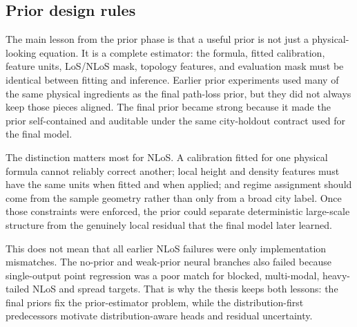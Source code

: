 \subsection{Prior design rules}
\label{sec:good_prior_design}

The main lesson from the prior phase is that a useful prior is not just a
physical-looking equation. It is a complete estimator: the formula, fitted
calibration, feature units, LoS/NLoS mask, topology features, and evaluation
mask must be identical between fitting and inference. Earlier prior experiments
used many of the same physical ingredients as the final path-loss prior, but they did
not always keep those pieces aligned. The final prior became strong because it
made the prior self-contained and auditable under the same city-holdout
contract used for the final model.

The distinction matters most for NLoS. A calibration fitted for one physical
formula cannot reliably correct another; local height and density features
must have the same units when fitted and when applied; and regime assignment
should come from the sample geometry rather than only from a broad city label.
Once those constraints were enforced, the prior could separate deterministic
large-scale structure from the genuinely local residual that the final model later
learned.

This does not mean that all earlier NLoS failures were only implementation
mismatches. The no-prior and weak-prior neural branches also failed because
single-output point regression was a poor match for blocked, multi-modal,
heavy-tailed NLoS and spread targets. That is why the thesis keeps both
lessons: the final priors fix the prior-estimator problem, while
the distribution-first predecessors motivate distribution-aware heads and residual
uncertainty.

